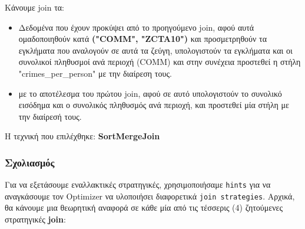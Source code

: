 \documentclass{article}
\begin{document}
\begin{enumerate}
Κάνουμε join τα:
\begin{itemize}
	\item Δεδομένα που έχουν προκύψει από το προηγούμενο join, αφού αυτά ομαδοποιηθούν κατά \textbf{("COMM", "ZCTA10")} και προσμετρηθούν τα εγκλήματα που αναλογούν σε αυτά τα ζεύγη, υπολογιστούν  τα εγκλήματα και οι συνολικοί πληθυσμοί ανά περιοχή (COMM) και στην συνέχεια προστεθεί η στήλη "crimes\_per\_person" με την διαίρεση τους. 
	\item με το αποτέλεσμα του πρώτου join, αφού σε αυτό υπολογιστούν το συνολικό εισόδημα και ο συνολικός πληθυσμός ανά περιοχή, και προστεθεί μία στήλη με την διαίρεσή τους. 
\end{itemize}
Η τεχνική που επιλέχθηκε: \textbf{SortMergeJoin} 
\end{enumerate}


\subsubsection*{Σχολιασμός}
Για να εξετάσουμε εναλλακτικές στρατηγικές, χρησιμοποιήσαμε \texttt{hints} για να αναγκάσουμε τον Optimizer να υλοποιήσει διαφορετικά \texttt{join strategies}. Αρχικά, θα κάνουμε μια θεωρητική αναφορά σε κάθε μία από τις τέσσερις (4) ζητούμενες στρατηγικές \textbf{join}:
\end{document}
